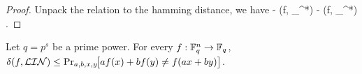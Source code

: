 \begin{proof}
    Unpack the relation to the hamming distance, we have
     -  \delta(f, \ell_{\beta^*})  - \epsilon \implies \delta(f, \ell_{\beta^*}) \le {}\epsilon.
    \ee

\end{proof}




\begin{lemma}
\label{BLR_via_GH}
\leanok
Let $q=p^s$ be a prime power. For every $f : \mathbb{F}_q^n \to \mathbb{F}_q$, $\delta(f, \mathcal{LIN}) \le \Pr_{a,b,x,y}\!\bigl[af(x) + bf(y) \ne f(ax + by)\bigr]$.
\end{lemma}

